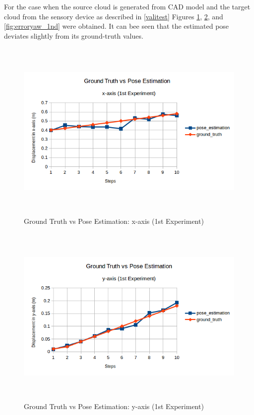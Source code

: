 For the case when the source cloud is generated from CAD model and the target cloud from the sensory device as described in \ref{valitest} Figures \ref{fig:errorx_1nd}, \ref{fig:errory_1nd}, and \ref{fig:erroryaw_1nd} were obtained. It can bee seen that the estimated pose deviates slightly from its ground-truth values.
\begin{figure}[!h]
\begin{center}
\includegraphics[width=5in, height=3.5in]{figures05/1_x_validation.png}
\caption{Ground Truth vs Pose Estimation: x-axis (1st Experiment)}
\label{fig:errorx_1nd}
\end{center}
\end{figure}
\begin{figure}[!h]
\begin{center}
\includegraphics[width=5in, height=3.5in]{figures05/1_y_validation.png}
\caption{Ground Truth vs Pose Estimation: y-axis (1st Experiment)}
\label{fig:errory_1nd}
\end{center}
\end{figure}
